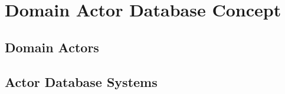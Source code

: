 
\section{Domain Actor Database Concept}
\subsection{Domain Actors}\label{sec:dactors}

\subsection{Actor Database Systems}\label{sec:actor_database_systems}
